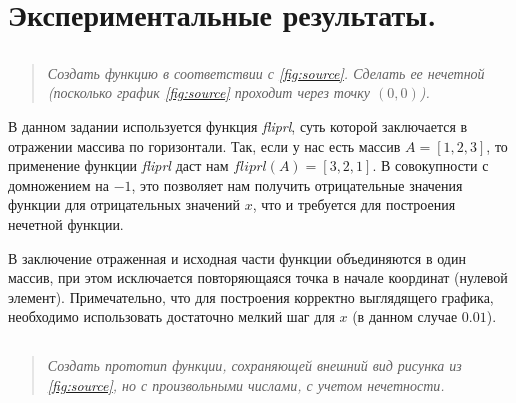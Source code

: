 \section*{Экспериментальные результаты.}
\subsection*{  }

\begin{quote}
    \textit{Создать функцию в соответствии с \cref{fig:source}. Сделать ее нечетной (посколько график \cref{fig:source} проходит через точку $(0, 0)$). }
\end{quote}


В данном задании используется функция \textit{fliprl}, суть которой заключается в отражении массива по горизонтали. Так, если у нас есть массив $A = [1, 2, 3]$, то применение функции \textit{fliprl} даст нам $fliprl(A) = [3, 2, 1]$.
В совокупности с домножением на $-1$, это позволяет нам получить отрицательные значения функции для отрицательных значений $x$, что и требуется для построения нечетной функции.

В заключение отраженная и исходная части функции объединяются в один массив, при этом исключается повторяющаяся точка в начале координат (нулевой элемент).
Примечательно, что для построения корректно выглядящего графика, необходимо использовать достаточно мелкий шаг для $x$ (в данном случае $0.01$).


\subsection*{  }
\begin{quote}
    \textit{Создать прототип функции, сохраняющей внешний вид рисунка из \cref{fig:source}, но с произвольными числами, с учетом нечетности.}
\end{quote}

